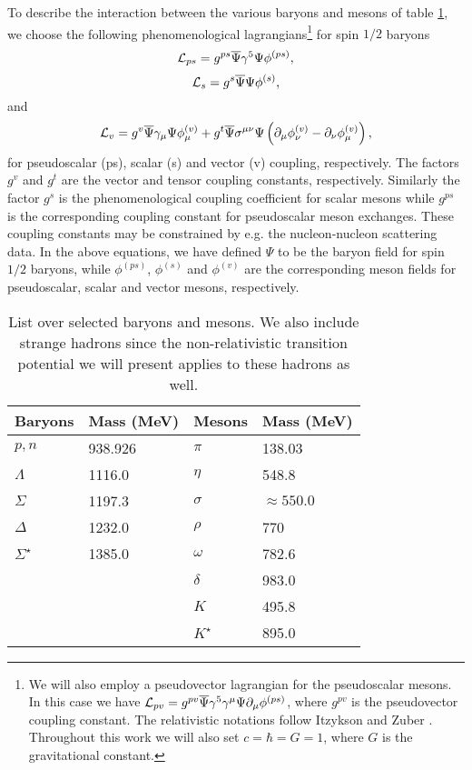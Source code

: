 To describe the interaction between the various baryons and mesons of table
\ref{tab:chap3tab1}, we choose the following phenomenological
lagrangians\footnote{We will also employ a pseudovector
lagrangian for the pseudoscalar mesons.
In this case we have
   ${\cal L}_{pv} =g^{pv}\overline{\Psi}\gamma^{5}
   \gamma^{\mu}\Psi\partial_{\mu}\phi^{(ps)}$, where $g^{pv}$ is the
   pseudovector coupling constant.
The relativistic notations follow
Itzykson and Zuber \cite{iz80}. Throughout this work we will also
set $c=\hbar =G=1$, where $G$ is the gravitational constant.}
for spin $1/2$ baryons
\begin{equation}
   {\cal L}_{ps} =g^{ps}\overline{\Psi}\gamma^{5}
   \Psi\phi^{(ps)},
   \label{eq:pseudo}
\end{equation}
\begin{equation}
   {\cal L}_{s} =g^{s}\overline{\Psi}\Psi\phi^{(s)},
   \label{eq:scalar}
\end{equation}
and
\begin{equation}
   {\cal L}_{v} =g^{v}\overline{\Psi}\gamma_{\mu}\Psi\phi_{\mu}^{(v)}
   +g^{t}\overline{\Psi}\sigma^{\mu\nu}\Psi\left
   (\partial_{\mu}\phi_{\nu}^{(v)}
   -\partial_{\nu}\phi_{\mu}^{(v)}\right),
   \label{eq:vector}
\end{equation}
for pseudoscalar (ps), scalar (s) and vector (v) coupling, respectively.
The factors $g^{v}$ and $g^{t}$ are the vector
and tensor coupling constants, respectively.
Similarly the factor $g^s$ is the
phenomenological coupling coefficient for scalar mesons while
$g^{ps}$ is the corresponding coupling constant for
pseudoscalar meson
exchanges. These coupling constants may be
constrained by e.g. the nucleon-nucleon scattering data.
In the above equations, we have defined $\Psi$ to be the baryon field for
spin $1/2$ baryons, while $\phi^{(ps)}$, $\phi^{(s)}$ and $\phi^{(v)}$
are the corresponding meson fields for pseudoscalar,
scalar and vector mesons, respectively.
\begin{table}[hbtp]
\caption{List over selected baryons and mesons.
We also include strange hadrons since the non-relativistic
transition potential we will present applies to these hadrons as well.}
\begin{center}
\begin{tabular}{llll}
\\\hline
\multicolumn{1}{c}{Baryons}&
\multicolumn{1}{c}{Mass (MeV)}&
\multicolumn{1}{c}{Mesons}&
\multicolumn{1}{c}{Mass (MeV)}
\\ \hline
$p,n$&938.926&$\pi$&138.03\\
$\Lambda$&1116.0&$\eta$&548.8\\
$\Sigma$&1197.3&$\sigma$&$\approx 550.0$\\
$\Delta$&1232.0&$\rho$&770\\
$\Sigma^{\star}$&1385.0&$\omega$&782.6\\
&&$\delta$&983.0\\
&&$K$&495.8\\
&&$K^{\star}$&895.0\\ \hline
\end{tabular}
\end{center}
\label{tab:chap3tab1}
\end{table}

